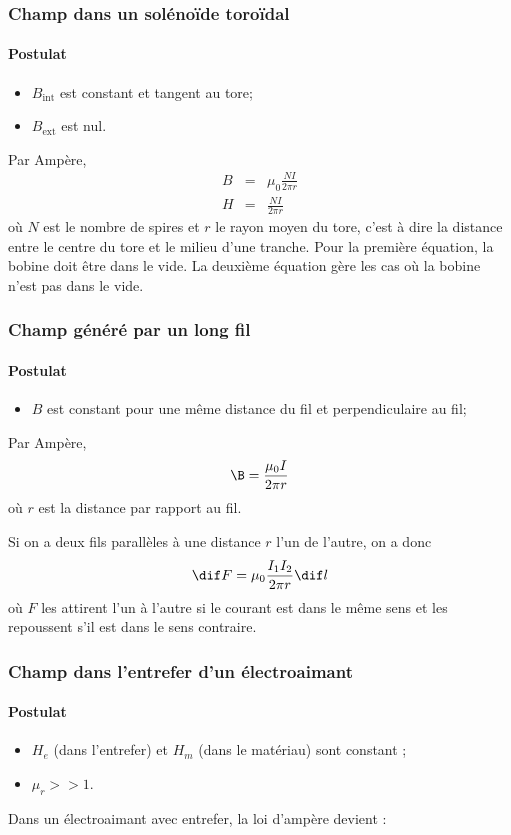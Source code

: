 \subsubsection{Champ dans un solénoïde toroïdal}
\label{sec:bst}
\paragraph{Postulat}
\begin{itemize}
  \item $B_\mathrm{int}$ est constant et tangent au tore;
  \item $B_\mathrm{ext}$ est nul.
\end{itemize}
Par Ampère,
\begin{eqnarray*}
  B &=& \mu_0\frac{NI}{2\pi r}\\
  H &=& \frac{NI}{2\pi r}
\end{eqnarray*}
où $N$ est le nombre de spires et $r$ le rayon moyen du tore,
c'est à dire la distance entre le centre du tore et le milieu d'une tranche.
Pour la première équation, la bobine doit être dans le vide.
La deuxième équation gère les cas où la bobine n'est pas dans le vide.

\subsubsection{Champ généré par un long fil}
\paragraph{Postulat}
\begin{itemize}
  \item $B$ est constant pour une même distance
    du fil et perpendiculaire au fil;
\end{itemize}
Par Ampère,
\[ \B = \frac{\mu_0I}{2\pi r} \]
où $r$ est la distance par rapport au fil.

Si on a deux fils parallèles à une distance $r$ l'un de l'autre, on a donc
\[ \dif F = \mu_0\frac{I_1I_2}{2\pi r}\dif l \]
où $F$ les attirent l'un à l'autre si le courant est
dans le même sens et les repoussent s'il est dans le sens contraire.

\subsubsection{Champ dans l'entrefer d'un électroaimant}
\paragraph{Postulat}
\begin{itemize}
  \item $H_e$ (dans l'entrefer) et $H_m$ (dans le matériau) sont constant ;
  \item $\mu_r >> 1$.
\end{itemize}
Dans un électroaimant avec entrefer, la loi d'ampère devient :

